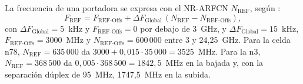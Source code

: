 La frecuencia de una portadora se expresa con el NR-ARFCN $N_\text{REF}$, según \cite[§5.4.2.1]{ts38101}:
\begin{equation}
F_\text{REF} = F_\text{REF-Offs} + \Delta F_\text{Global}\,(N_\text{REF}-N_\text{REF-Offs}),
\label{eq:arfcn}
\end{equation}
con $\Delta F_\text{Global}=5$~kHz y $F_\text{REF-Offs}=0$ por debajo de 3~GHz, y $\Delta F_\text{Global}=15$~kHz, $F_\text{REF-Offs}=3000$~MHz y $N_\text{REF-Offs}=600\,000$ entre 3 y 24,25~GHz. Para la celda n78, $N_\text{REF}=635\,000$ da $3000 + 0{,}015\cdot 35\,000 = 3525$~MHz. Para la n3, $N_\text{REF}=368\,500$ da $0{,}005\cdot 368\,500=1842{,}5$~MHz en la bajada y, con la separación dúplex de 95~MHz, 1747,5~MHz en la subida.
